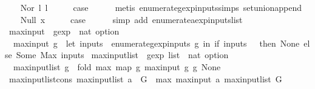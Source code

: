 \begin{isabellebody}
\isamarkupfalse%
\isanewline
\ \ \isamarkupfalse%
\ {\isacharparenleft}Nor\ l{}\ l{}{\isacharparenright}\isanewline
\ \ \isamarkupfalse%
\ \isamarkupfalse%
\ {\isacharquery}case\isanewline
\ \ \ \ \isamarkupfalse%
\ {\isacharparenleft}metis\ enumerate{\isacharunderscore}gexp{\isacharunderscore}inputs{\isachardot}simps{\isacharparenleft}{}{\isacharparenright}\ set{\isacharunderscore}union{\isacharunderscore}append{\isacharparenright}\isanewline
{}\isamarkupfalse%
\isanewline
\ \ \isamarkupfalse%
\ {\isacharparenleft}Null\ x{\isacharparenright}\isanewline
\ \ \isamarkupfalse%
\ \isamarkupfalse%
\ {\isacharquery}case\isanewline
\ \ \ \ \isamarkupfalse%
\ {\isacharparenleft}simp\ add{\isacharcolon}\ enumerate{\isacharunderscore}aexp{\isacharunderscore}inputs{\isacharunderscore}list{\isacharparenright}\isanewline
{}\isamarkupfalse%
%
\endisatagproof
{\isafoldproof}%
%
\isadelimproof
\isanewline
%
\endisadelimproof
\isanewline
{}\isamarkupfalse%
\ max{\isacharunderscore}input\ {\isacharcolon}{\isacharcolon}\ {\isachardoublequoteopen}gexp\ {\isasymRightarrow}\ nat\ option{\isachardoublequoteclose}\ \isanewline
\ \ {\isachardoublequoteopen}max{\isacharunderscore}input\ g\ {\isacharequal}\ {\isacharparenleft}let\ inputs\ {\isacharequal}\ {\isacharparenleft}enumerate{\isacharunderscore}gexp{\isacharunderscore}inputs\ g{\isacharparenright}\ in\ if\ inputs\ {\isacharequal}\ {\isacharbraceleft}{\isacharbraceright}\ then\ None\ else\ Some\ {\isacharparenleft}Max\ inputs{\isacharparenright}{\isacharparenright}{\isachardoublequoteclose}\isanewline
\isanewline
{}\isamarkupfalse%
\ max{\isacharunderscore}input{\isacharunderscore}list\ {\isacharcolon}{\isacharcolon}\ {\isachardoublequoteopen}gexp\ list\ {\isasymRightarrow}\ nat\ option{\isachardoublequoteclose}\ \isanewline
\ \ {\isachardoublequoteopen}max{\isacharunderscore}input{\isacharunderscore}list\ g\ {\isacharequal}\ {\isacharparenleft}fold\ max\ {\isacharparenleft}map\ {\isacharparenleft}{\isasymlambda}g{\isachardot}\ max{\isacharunderscore}input\ g{\isacharparenright}\ g{\isacharparenright}\ None{\isacharparenright}{\isachardoublequoteclose}\isanewline
\isanewline
{}\isamarkupfalse%
\ max{\isacharunderscore}input{\isacharunderscore}list{\isacharunderscore}cons{\isacharcolon}\ {\isachardoublequoteopen}max{\isacharunderscore}input{\isacharunderscore}list\ {\isacharparenleft}a\ {\isacharhash}\ G{\isacharparenright}\ {\isacharequal}\ max\ {\isacharparenleft}max{\isacharunderscore}input\ a{\isacharparenright}\ {\isacharparenleft}max{\isacharunderscore}input{\isacharunderscore}list\ G{\isacharparenright}{\isachardoublequoteclose}\isanewline

\end{isabellebody}
